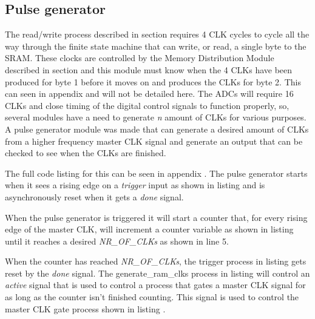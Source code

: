 \subsection{Pulse generator} \label{subsec:Pulse_Generator} 
The read/write process described in section  requires 4 CLK cycles to cycle all the way through the finite state machine that can write, or read, a single byte to the SRAM. These clocks are controlled by the Memory Distribution Module described in section  and this module must know when the 4 CLKs have been produced for byte 1 before it moves on and produces the CLKs for byte 2. This can seen in appendix  and will not be detailed here. The ADCs will require 16 CLKs and close timing of the digital control signals to function properly, so, several modules have a need to generate \textit{n} amount of CLKs for various purposes. A pulse generator module was made that can generate a desired amount of CLKs from a higher frequency master CLK signal and generate an output that can be checked to see when the CLKs are finished.

The full code listing for this can be seen in appendix . The pulse generator starts when it sees a rising edge on a \textit{trigger} input as shown in listing  and is asynchronously reset when it gets a \textit{done} signal.



When the pulse generator is triggered it will start a counter that, for every rising edge of the master CLK, will increment a counter variable as shown in listing  until it reaches a desired \textit{NR\_OF\_CLKs} as shown in line 5.



When the counter has reached \textit{NR\_OF\_CLKs}, the trigger process in listing  gets reset by the \textit{done} signal. The generate\_ram\_clks process in listing  will control an \textit{active} signal that is used to control a process that gates a master CLK signal for as long as the counter isn't finished counting. This signal is used to control the master CLK gate process shown in listing .

